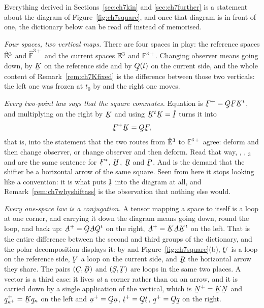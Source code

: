 \begin{remark}%
\label{rem:ch7square}
Everything derived in Sections~\ref{sec:ch7kin} and
\ref{sec:ch7further} is a statement about the diagram of
Figure~\ref{fig:ch7square}, and once that diagram is in front of one, the
dictionary below can be read off instead of memorised.

\emph{Four spaces, two vertical maps.} There are four spaces in play: the
reference spaces $\hat{\mathbb{E}}^{3}$ and $\hat{\mathbb{E}}^{3+}$ and the current
spaces $\mathbb{E}^{3}$ and $\mathbb{E}^{3+}$. Changing observer means going down,
by $\bK$ on the reference side and by $\bQ(t)$ on the current side, and
the whole content of Remark~\ref{rem:ch7Kfixed} is the difference between
those two verticals: the left one was frozen at $t_{0}$ by  and
the right one moves.

\emph{Every two-point law says that the square commutes.} Equation
 is $\bF^{+}=\bQ\bF\bK^{t}$, and multiplying on the right by
$\bK$ and using $\bK^{t}\bK=\hI$ turns it into
\[
   \bF^{+}\bK=\bQ\bF ,
\]
that is, into the statement that the two routes from $\hat{\mathbb{E}}^{3}$ to
$\mathbb{E}^{3+}$ agree: deform and then change observer, or change
observer and then deform. Read that way, , ,
$_{3}$ and  are the same sentence for $\bF^{*}$,
$\bH$, $\bR$ and $\bP$. And  is the demand that the shifter be
a horizontal arrow of the same square. Seen from here it stops looking
like a convention: it is what puts $\shift$ into the diagram at all, and
Remark~\ref{rem:ch7whyshiftass} is the observation that nothing else
would.

\emph{Every one-space law is a conjugation.} A tensor mapping a space to
itself is a loop at one corner, and carrying it down the diagram means
going down, round the loop, and back up: $\bA^{+}=\bQ\bA\bQ^{t}$ on the
right, $\bA^{+}=\bK\bA\bK^{t}$ on the left. That is the entire difference
between the second and third groups of the dictionary, and the polar
decomposition displays it: by  and
Figure~\ref{fig:ch7square}(b), $\bU$ is a loop on the reference side,
$\bV$ a loop on the current side, and $\bR$ the horizontal arrow they
share. The pairs $(\bC,\bB)$ and $(\bS,\bT)$ are loops in the same two
places. A vector is a third case: it lives \emph{at} a corner rather than
on an arrow, and it is carried down by a single application of the
vertical, which is $\bN^{+}=\bK\bN$ and $\bq^{+}_{\kappa^{+}}
=\bK\bq_{\kappa}$ on the left and $\bn^{+}=\bQ\bn$, $\bt^{+}=\bQ\bt$,
$\bq^{+}=\bQ\bq$ on the right.


\end{remark}
